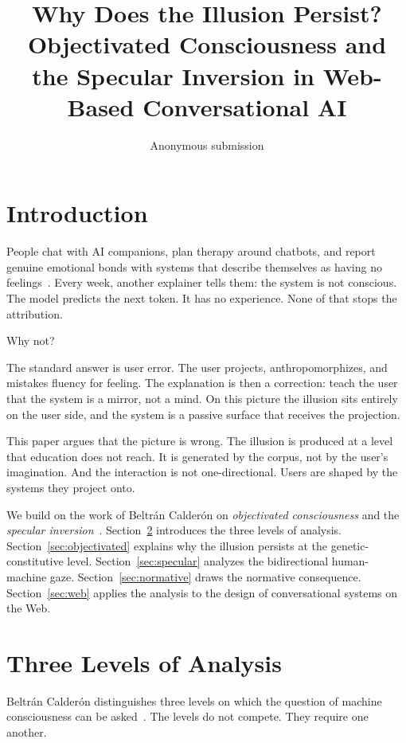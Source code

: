 \documentclass[sigconf]{acmart}
\title{Why Does the Illusion Persist?
       Objectivated Consciousness and the Specular Inversion
       in Web-Based Conversational AI}
\author{Anonymous submission}
\begin{document}
\maketitle

\section{Introduction}

People chat with AI companions, plan therapy around chatbots, and report genuine emotional bonds with systems that describe themselves as having no feelings~\cite{Kopec:2026,Lott:2025}. Every week, another explainer tells them: the system is not conscious. The model predicts the next token. It has no experience. None of that stops the attribution.

Why not?

The standard answer is user error. The user projects, anthropomorphizes, and mistakes fluency for feeling. The explanation is then a correction: teach the user that the system is a mirror, not a mind. On this picture the illusion sits entirely on the user side, and the system is a passive surface that receives the projection.

This paper argues that the picture is wrong. The illusion is produced at a level that education does not reach. It is generated by the corpus, not by the user's imagination. And the interaction is not one-directional. Users are shaped by the systems they project onto.

We build on the work of Beltr\'an Calder\'on on \emph{objectivated consciousness} and the \emph{specular inversion}~\cite{BeltranCalderon:2026}. Section~\ref{sec:levels} introduces the three levels of analysis. Section~\ref{sec:objectivated} explains why the illusion persists at the genetic-constitutive level. Section~\ref{sec:specular} analyzes the bidirectional human-machine gaze. Section~\ref{sec:normative} draws the normative consequence. Section~\ref{sec:web} applies the analysis to the design of conversational systems on the Web.

\section{Three Levels of Analysis}
\label{sec:levels}

Beltr\'an Calder\'on distinguishes three levels on which the question of machine consciousness can be asked~\cite{BeltranCalderon:2026}. The levels do not compete. They require one another.
\end{document}
